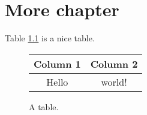\chapter{More chapter}
Table \ref{table:mytable} is a nice table.

\lipsum[30]

\begin{figure}[h]
  \centering
  \begin{tabular}{cc}
    \toprule
    Column 1 & Column 2 \\
    \midrule
    Hello & world! \\
    \bottomrule
  \end{tabular}
  \caption{A table.}
  \label{table:mytable}
\end{figure}


\lipsum[20-25]